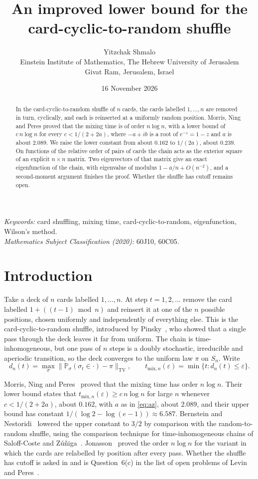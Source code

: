 \documentclass[11pt,a4paper]{article}
\title{\vspace{-1.4em}\textbf{An improved lower bound for the card-cyclic-to-random shuffle}}
\author{Yitzchak Shmalo\\[0.4em]
\small Einstein Institute of Mathematics, The Hebrew University of Jerusalem\\
\small Givat Ram, Jerusalem, Israel}
\date{16 November 2026}
\numberwithin{equation}{section}
\theoremstyle{remark}
\newcommand{\Pp}{\mathbb P}
\newcommand{\eps}{\varepsilon}
\newcommand{\tv}[1]{\lVert#1\rVert_{\mathrm{TV}}}
\begin{document}
\maketitle

\begin{abstract}
In the card-cyclic-to-random shuffle of $n$ cards, the cards labelled $1,\dots,n$ are removed in turn, cyclically, and each is reinserted at a uniformly random position. Morris, Ning and Peres proved that the mixing time is of order $n\log n$, with a lower bound of $c\,n\log n$ for every $c<1/(2+2a)$, where $-a+ib$ is a root of $e^{-z}=1-z$ and $a$ is about $2.089$. We raise the lower constant from about $0.162$ to $1/(2a)$, about $0.239$. On functions of the relative order of pairs of cards the chain acts as the exterior square of an explicit $n\times n$ matrix. Two eigenvectors of that matrix give an exact eigenfunction of the chain, with eigenvalue of modulus $1-a/n+O(n^{-2})$, and a second-moment argument finishes the proof. Whether the shuffle has cutoff remains open.
\end{abstract}

\noindent\textit{Keywords:} card shuffling, mixing time, card-cyclic-to-random, eigenfunction, Wilson's method.\\
\textit{Mathematics Subject Classification (2020):} 60J10, 60C05.

\section{Introduction}

Take a deck of $n$ cards labelled $1,\dots,n$. At step $t=1,2,\dots$ remove the card labelled $1+((t-1)\bmod n)$ and reinsert it at one of the $n$ possible positions, chosen uniformly and independently of everything else. This is the card-cyclic-to-random shuffle, introduced by Pinsky~\cite{Pin}, who showed that a single pass through the deck leaves it far from uniform. The chain is time-inhomogeneous, but one pass of $n$ steps is a doubly stochastic, irreducible and aperiodic transition, so the deck converges to the uniform law $\pi$ on $S_n$. Write
\[
d_n(t)=\max_{\sigma}\tv{\Pp_\sigma(\sigma_t\in\cdot)-\pi},\qquad t_{\mathrm{mix},n}(\eps)=\min\{t:d_n(t)\le\eps\}.
\]

Morris, Ning and Peres~\cite{MNP} proved that the mixing time has order $n\log n$. Their lower bound \cite[Theorem~1]{MNP} states that $t_{\mathrm{mix},n}(\eps)\ge c\,n\log n$ for large $n$ whenever $c<1/(2+2a)$, about $0.162$, with $a$ as in \eqref{eq:az}, about $2.089$, and their upper bound \cite[Theorem~2]{MNP} has constant $1/(\log2-\log(e-1))\approx6.587$. Bernstein and Nestoridi~\cite[Corollary~19]{BN} lowered the upper constant to $3/2$ by comparison with the random-to-random shuffle, using the comparison technique for time-inhomogeneous chains of Saloff-Coste and Z\'u\~niga~\cite{SCZ}. Jonasson~\cite{Jon} proved the order $n\log n$ for the variant in which the cards are relabelled by position after every pass. Whether the shuffle has cutoff is asked in \cite{MNP} and is Question~6(c) in the list of open problems of Levin and Peres~\cite[Chapter~26]{LP}.
\end{document}
